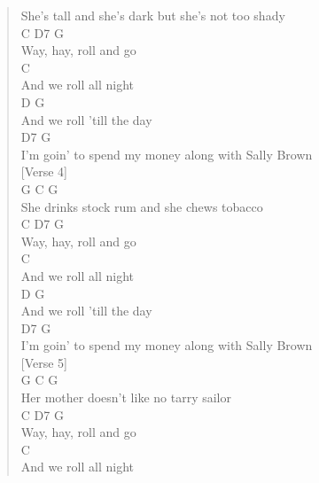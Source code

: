 \documentclass[11pt]{article}
\begin{document}
\begin{verse}
She's tall and she's dark but she's not too shady\\
\hspace*{5em}C     D7      G\\
Way, hay, roll and go\\
\hspace*{18em}C\\
And we roll all night\\
\hspace*{8em}D              G\\
And we roll 'till the day\\
\hspace*{41em}D7    G\\
I'm goin' to spend my money along with Sally Brown\\
\vspace*{1em}
\vspace*{1em}
[Verse 4]\\
\vspace*{1em}
G                              C      G\\
She drinks stock rum and she chews tobacco\\
\hspace*{5em}C     D7      G\\
Way, hay, roll and go\\
\hspace*{18em}C\\
And we roll all night\\
\hspace*{8em}D              G\\
And we roll 'till the day\\
\hspace*{41em}D7    G\\
I'm goin' to spend my money along with Sally Brown\\
\vspace*{1em}
\vspace*{1em}
[Verse 5]\\
\vspace*{1em}
G                            C     G\\
Her mother doesn't like no tarry sailor\\
\hspace*{5em}C     D7      G\\
Way, hay, roll and go\\
\hspace*{18em}C\\
And we roll all night\\

\end{verse}
\end{document}
